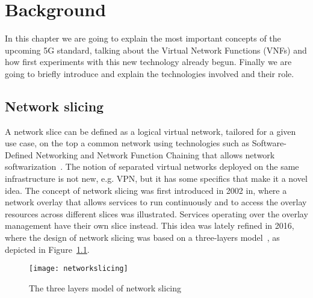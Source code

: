 \chapter{Background}
\label{chap:background}

In this chapter we are going to explain the most important concepts of the 
upcoming 5G standard, talking about the Virtual Network Functions (VNFs) and 
how first experiments with this new technology already begun. Finally we are 
going to briefly introduce and explain the technologies involved and their role.

\section{Network slicing}
A network slice can be defined as a logical virtual network, tailored for a
given use case, on the top a common network using technologies such as
Software-Defined Networking and Network Function Chaining that allows network
softwarization~\cite{ordonez2017network}. The notion of separated virtual
networks deployed on the same infrastructure is not new, e.g. VPN, but it has
some specifics that make it a novel idea. The concept of network slicing was
first introduced in 2002 in\cite{peterson2003blueprint}, where a network 
overlay that allows services to run continuously and to access the overlay
resources across different slices was illustrated.
Services operating over the overlay management have their own slice instead.
This idea was lately refined in 2016, where the design of network slicing was
based on a three-layers model~\cite{alliance2016description}, as depicted in 
Figure~\ref{chap:background:img:network_slicing}.

\begin{figure}
  \centering
  \texttt{[image: networkslicing]}
  \caption{The three layers model of network
  slicing~\cite{alliance2016description}}
  \label{chap:background:img:network_slicing}
\end{figure}


